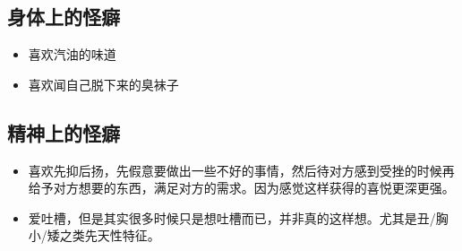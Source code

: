 \documentclass[UTF8]{ctexart}
\begin{document}
\subsection{身体上的怪癖}\begin{itemize}
\item 喜欢汽油的味道
\item 喜欢闻自己脱下来的臭袜子
\end{itemize}
\subsection{精神上的怪癖}
\begin{itemize}
\item 喜欢先抑后扬，先假意要做出一些不好的事情，然后待对方感到受挫的时候再给予对方想要的东西，满足对方的需求。因为感觉这样获得的喜悦更深更强。
\item 爱吐槽，但是其实很多时候只是想吐槽而已，并非真的这样想。尤其是丑/胸小/矮之类先天性特征。
\end{itemize}
\end{document}
